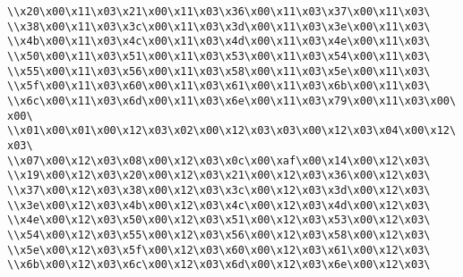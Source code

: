 \verb|\\x20\x00\x11\x03\x21\x00\x11\x03\x36\x00\x11\x03\x37\x00\x11\x03\|\newline
\verb|\\x38\x00\x11\x03\x3c\x00\x11\x03\x3d\x00\x11\x03\x3e\x00\x11\x03\|\newline
\verb|\\x4b\x00\x11\x03\x4c\x00\x11\x03\x4d\x00\x11\x03\x4e\x00\x11\x03\|\newline
\verb|\\x50\x00\x11\x03\x51\x00\x11\x03\x53\x00\x11\x03\x54\x00\x11\x03\|\newline
\verb|\\x55\x00\x11\x03\x56\x00\x11\x03\x58\x00\x11\x03\x5e\x00\x11\x03\|\newline
\verb|\\x5f\x00\x11\x03\x60\x00\x11\x03\x61\x00\x11\x03\x6b\x00\x11\x03\|\newline
\verb|\\x6c\x00\x11\x03\x6d\x00\x11\x03\x6e\x00\x11\x03\x79\x00\x11\x03\x00\x00\|\newline
\verb|\\x01\x00\x01\x00\x12\x03\x02\x00\x12\x03\x03\x00\x12\x03\x04\x00\x12\x03\|\newline
\verb|\\x07\x00\x12\x03\x08\x00\x12\x03\x0c\x00\xaf\x00\x14\x00\x12\x03\|\newline
\verb|\\x19\x00\x12\x03\x20\x00\x12\x03\x21\x00\x12\x03\x36\x00\x12\x03\|\newline
\verb|\\x37\x00\x12\x03\x38\x00\x12\x03\x3c\x00\x12\x03\x3d\x00\x12\x03\|\newline
\verb|\\x3e\x00\x12\x03\x4b\x00\x12\x03\x4c\x00\x12\x03\x4d\x00\x12\x03\|\newline
\verb|\\x4e\x00\x12\x03\x50\x00\x12\x03\x51\x00\x12\x03\x53\x00\x12\x03\|\newline
\verb|\\x54\x00\x12\x03\x55\x00\x12\x03\x56\x00\x12\x03\x58\x00\x12\x03\|\newline
\verb|\\x5e\x00\x12\x03\x5f\x00\x12\x03\x60\x00\x12\x03\x61\x00\x12\x03\|\newline
\verb|\\x6b\x00\x12\x03\x6c\x00\x12\x03\x6d\x00\x12\x03\x6e\x00\x12\x03\|\newline
